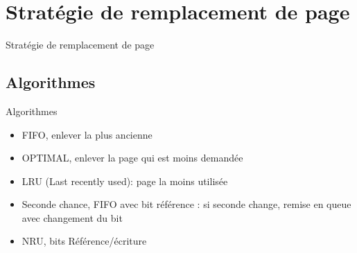 \def\sectitle{Stratégie de remplacement de page}
\section{\sectitle}
\begin{frame}{\sectitle}
\def\subsectitle{Algorithmes}
\subsection{\subsectitle}
\begin{block}{\subsectitle}
\begin{itemize}
    \item FIFO, enlever la plus ancienne
    \item OPTIMAL, enlever la page qui est moins demandée
    \item LRU (Last recently used): page la moins utilisée
    \item Seconde chance, FIFO avec bit référence : si seconde change, remise en
    queue avec changement du bit
    \item NRU, bits Référence/écriture
\end{itemize}
\end{block}
\end{frame}

